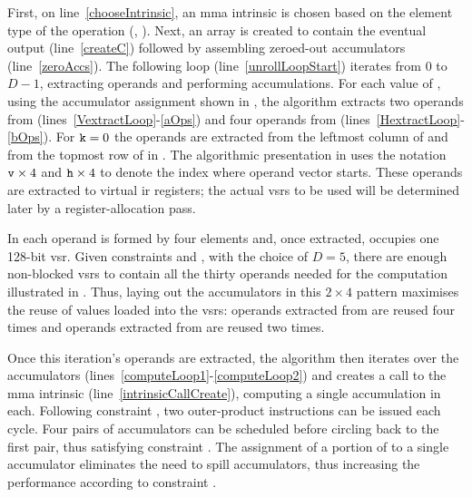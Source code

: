 \documentclass[\main/thesis.tex]{subfiles}
\begin{document}
First, on line~\ref{chooseIntrinsic}, an \gls{mma} \gls{intrinsic} is chosen based on the element type of the operation (\eg {}, ).\footnotemark
{}
Next, an array is created to contain the eventual output (line~\ref{createC}) followed by assembling zeroed-out accumulators (line~\ref{zeroAccs}).
The following loop (line~\ref{unrollLoopStart}) iterates from $0$ to $D-1$, extracting operands and performing accumulations.
For each value of , using the accumulator assignment shown in , the algorithm extracts two operands from  (lines~\ref{VextractLoop}-\ref{aOps}) and four operands from  (lines~\ref{HextractLoop}-\ref{bOps}).
For $\text{\code{k}}=0$ the operands are extracted from the leftmost column of  and from the topmost row of  in .
The algorithmic presentation in  uses the notation \code{ATile[}$\text{\code{v}} \times 4$\code{][k]} and \code{BTile[}$\text{\code{h}} \times 4$\code{][k]} to denote the index where operand vector starts.
These operands are extracted to virtual \gls{ir} registers; the actual \glspl{vsr} to be used will be determined later by a register-allocation pass.

In  each operand is formed by four elements and, once extracted, occupies one 128-bit \gls{vsr}.
Given constraints  and , with the choice of $D = 5$, there are enough non-blocked \glspl{vsr} to contain all the thirty operands needed for the computation illustrated in .
Thus, laying out the accumulators in this $2 \times 4$ pattern maximises the reuse of values loaded into the \glspl{vsr}: operands extracted from  are reused four times and operands extracted from  are reused two times.

Once this iteration's operands are extracted, the algorithm then iterates over the accumulators (lines~\ref{computeLoop1}-\ref{computeLoop2}) and creates a call to the \gls{mma} \gls{intrinsic} (line~\ref{intrinsicCallCreate}), computing a single accumulation in each.
Following constraint , two outer-product instructions can be issued each cycle.
Four pairs of accumulators can be scheduled before circling back to the first pair, thus satisfying constraint .
The assignment of a portion of  to a single accumulator eliminates the need to \gls{spill} accumulators, thus increasing the performance according to constraint .
\end{document}
